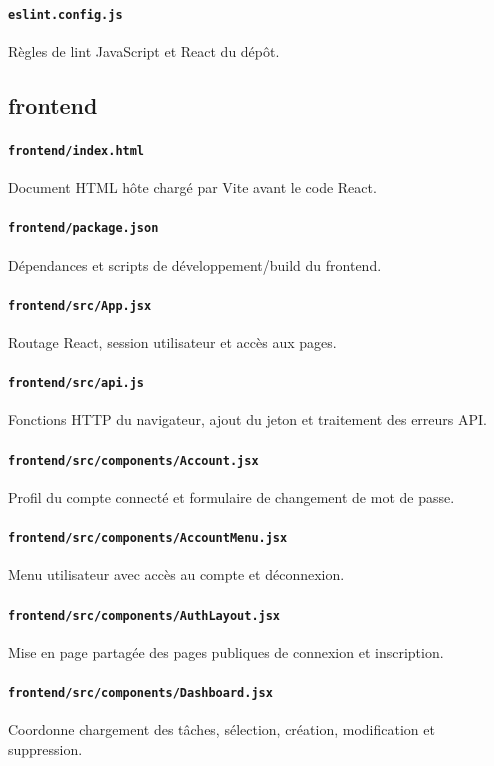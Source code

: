 \documentclass[10pt,a4paper]{article}
\begin{document}
\paragraph{\texttt{eslint.config.js}} Règles de lint JavaScript et React du dépôt.
\subsection*{frontend}
\paragraph{\texttt{frontend/index.html}} Document HTML hôte chargé par Vite avant le code React.
\paragraph{\texttt{frontend/package.json}} Dépendances et scripts de développement/build du frontend.
\paragraph{\texttt{frontend/src/App.jsx}} Routage React, session utilisateur et accès aux pages.
\paragraph{\texttt{frontend/src/api.js}} Fonctions HTTP du navigateur, ajout du jeton et traitement des erreurs API.
\paragraph{\texttt{frontend/src/components/Account.jsx}} Profil du compte connecté et formulaire de changement de mot de passe.
\paragraph{\texttt{frontend/src/components/AccountMenu.jsx}} Menu utilisateur avec accès au compte et déconnexion.
\paragraph{\texttt{frontend/src/components/AuthLayout.jsx}} Mise en page partagée des pages publiques de connexion et inscription.
\paragraph{\texttt{frontend/src/components/Dashboard.jsx}} Coordonne chargement des tâches, sélection, création, modification et suppression.
\end{document}
